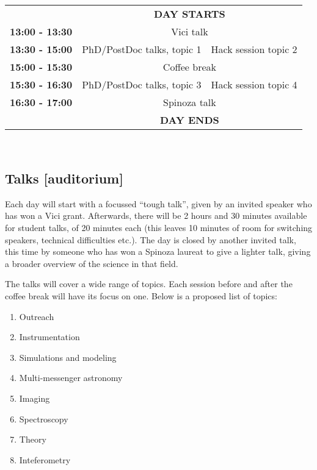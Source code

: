 \documentclass{article}
\begin{document}
\begin{tabular}{ll|l}
    & \multicolumn{2}{c}{\textbf{DAY STARTS}} \\
    \cline{2-3}
    \textbf{13:00 - 13:30} & \multicolumn{2}{c}{Vici talk} \\
    \textbf{13:30 - 15:00} & PhD/PostDoc talks, topic 1 & Hack session topic 2 \\
    \textbf{15:00 - 15:30} & \multicolumn{2}{c}{Coffee break} \\
    \textbf{15:30 - 16:30} & PhD/PostDoc talks, topic 3 & Hack session topic 4 \\
    \textbf{16:30 - 17:00} & \multicolumn{2}{c}{Spinoza talk} \\
    \cline{2-3}
    & \multicolumn{2}{c}{\textbf{DAY ENDS}}
\end{tabular}\\%

\subsection{Talks [auditorium]}

Each day will start with a focussed ``tough talk'', given by an
invited speaker who has won a Vici grant. Afterwards, there will be 2
hours and 30 minutes available for student talks, of 20 minutes each
(this leaves 10 minutes of room for switching speakers, technical
difficulties etc.). The day is closed by another invited talk, this
time by someone who has won a Spinoza laureat to give a lighter talk,
giving a broader overview of the science in that field.

The talks will cover a wide range of topics. Each session before and
after the coffee break will have its focus on one. Below is a proposed
list of topics:
\begin{multicols}{2}
    \begin{enumerate}
        \item Outreach
        \item Instrumentation
        \item Simulations and modeling
        \item Multi-messenger astronomy
        \item Imaging
        \item Spectroscopy
        \item Theory
        \item Inteferometry
    \end{enumerate}
\end{multicols}
\end{document}
